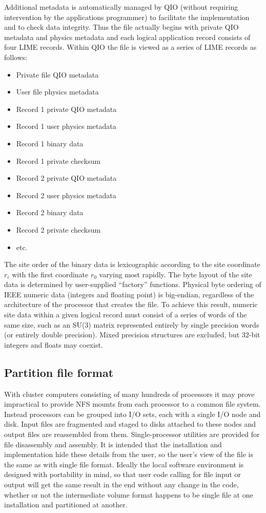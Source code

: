 \documentclass{article}
\begin{document}
Additional metadata is automatically managed by QIO (without requiring
intervention by the applications programmer) to facilitate the
implementation and to check data integrity.  Thus the file actually
begins with private QIO metadata and physics metadata and each logical
application record consists of four LIME records.  Within QIO the file
is viewed as a series of LIME records as follows:
%
\begin{itemize}
  \item Private file QIO metadata
  \item User file physics metadata
  \item Record 1 private QIO metadata
  \item Record 1 user physics metadata
  \item Record 1 binary data
  \item Record 1 private checksum
  \item Record 2 private QIO metadata
  \item Record 2 user physics metadata
  \item Record 2 binary data
  \item Record 2 private checksum
  \item etc.
\end{itemize}
%
The site order of the binary data is lexicographic according to the
site coordinate $r_i$ with the first coordinate $r_0$ varying most
rapidly.  The byte layout of the site data is determined by
user-supplied ``factory'' functions.  Physical byte ordering of IEEE
numeric data (integers and floating point) is big-endian, regardless
of the architecture of the processor that creates the file.  To
achieve this result, numeric site data within a given logical record
must consist of a series of words of the same size, such as an SU(3)
matrix represented entirely by single precision words (or entirely
double precision).  Mixed precision structures are excluded, but
32-bit integers and floats may coexist.

\subsection{Partition file format}

With cluster computers consisting of many hundreds of processors it
may prove impractical to provide NFS mounts from each processor to a
common file system.  Instead processors can be grouped into I/O sets,
each with a single I/O node and disk.  Input files are fragmented and
staged to disks attached to these nodes and output files are
reassembled from them.  Single-processor utilities are provided for
file disassembly and assembly.  It is intended that the installation
and implementation hide these details from the user, so the user's
view of the file is the same as with single file format.  Ideally the
local software environment is designed with portability in mind, so
that user code calling for file input or output will get the same
result in the end without any change in the code, whether or not the
intermediate volume format happens to be single file at one
installation and partitioned at another.
\end{document}
